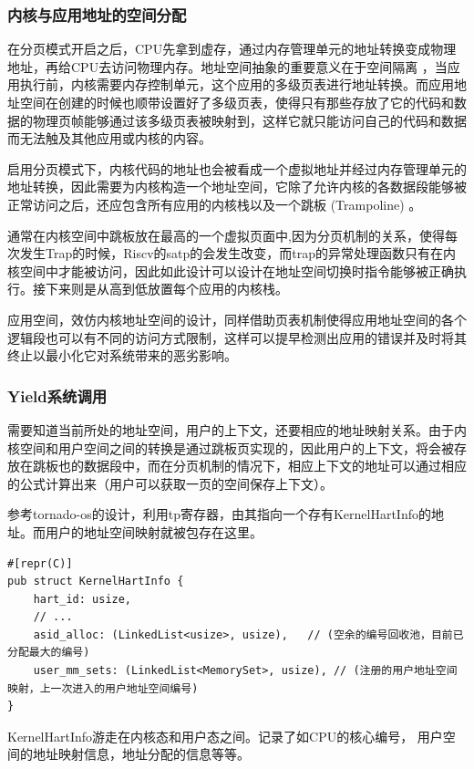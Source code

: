 \subsubsection{内核与应用地址的空间分配}

在分页模式开启之后，CPU先拿到虚存，通过内存管理单元的地址转换变成物理地址，再给CPU去访问物理内存。地址空间抽象的重要意义在于空间隔离 ，当应用执行前，内核需要内存控制单元，这个应用的多级页表进行地址转换。而应用地址空间在创建的时候也顺带设置好了多级页表，使得只有那些存放了它的代码和数据的物理页帧能够通过该多级页表被映射到，这样它就只能访问自己的代码和数据而无法触及其他应用或内核的内容。

启用分页模式下，内核代码的地址也会被看成一个虚拟地址并经过内存管理单元的地址转换，因此需要为内核构造一个地址空间，它除了允许内核的各数据段能够被正常访问之后，还应包含所有应用的内核栈以及一个跳板 (Trampoline) 。

通常在内核空间中跳板放在最高的一个虚拟页面中,因为分页机制的关系，使得每次发生Trap的时候，Riscv的satp的会发生改变，而trap的异常处理函数只有在内核空间中才能被访问，因此如此设计可以设计在地址空间切换时指令能够被正确执行。接下来则是从高到低放置每个应用的内核栈。

应用空间，效仿内核地址空间的设计，同样借助页表机制使得应用地址空间的各个逻辑段也可以有不同的访问方式限制，这样可以提早检测出应用的错误并及时将其终止以最小化它对系统带来的恶劣影响。

\subsubsection{Yield系统调用}

需要知道当前所处的地址空间，用户的上下文，还要相应的地址映射关系。由于内核空间和用户空间之间的转换是通过跳板页实现的，因此用户的上下文，将会被存放在跳板也的数据段中，而在分页机制的情况下，相应上下文的地址可以通过相应的公式计算出来（用户可以获取一页的空间保存上下文）。

参考tornado-os的设计，利用tp寄存器，由其指向一个存有KernelHartInfo的地址。而用户的地址空间映射就被包存在这里。

\begin{lstlisting}[caption=KernelHartInfo的结构]
#[repr(C)]
pub struct KernelHartInfo {
    hart_id: usize,
    // ...
    asid_alloc: (LinkedList<usize>, usize),   // (空余的编号回收池，目前已分配最大的编号)
    user_mm_sets: (LinkedList<MemorySet>, usize), // (注册的用户地址空间映射，上一次进入的用户地址空间编号)
}
\end{lstlisting}

KernelHartInfo游走在内核态和用户态之间。记录了如CPU的核心编号， 用户空间的地址映射信息，地址分配的信息等等。


